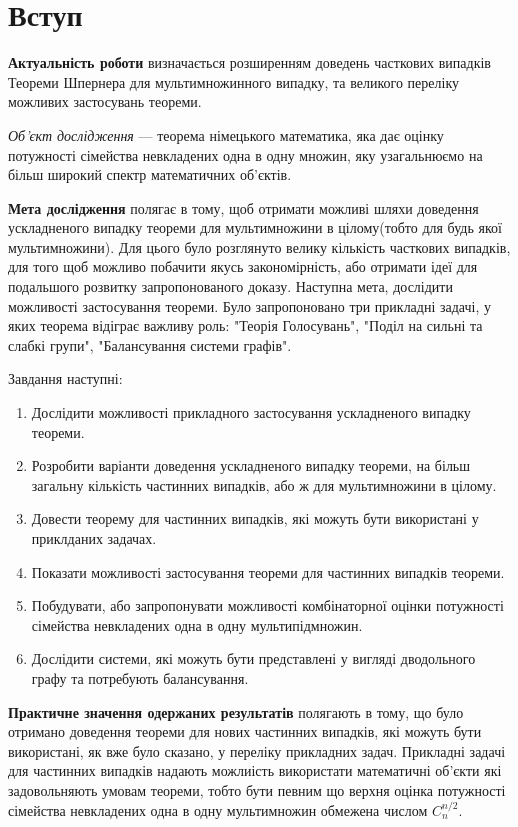 \chapter*{Вступ}

\textbf{Актуальність роботи} визначається розширенням доведень часткових випадків Теореми Шпернера для мультимножинного випадку, та великого переліку можливих застосувань теореми.

\textit{Об’єкт дослідження} --- теорема німецького математика, яка дає оцінку потужності сімейства невкладених одна в одну множин, яку узагальнюємо на більш широкий спектр математичних об'єктів.

\textbf{Мета дослідження} полягає в тому, щоб отримати можливі шляхи доведення ускладненого випадку теореми для мультимножини в цілому(тобто для будь якої мультимножини). Для цього було розглянуто велику кількість часткових випадків, для того щоб можливо побачити якусь закономірність, або отримати ідеї для подальшого розвитку запропонованого доказу. Наступна мета, дослідити можливості застосування теореми. Було запропоновано три прикладні задачі, у яких теорема відіграє важливу роль: "Теорія Голосувань", "Поділ на сильні та слабкі групи", "Балансування системи графів".

Завдання наступні:
\begin{enumerate}
  \item
    Дослідити можливості прикладного застосування ускладненого випадку теореми.
  \item
    Розробити варіанти доведення ускладненого випадку теореми, на більш загальну кількість частинних випадків, або ж для мультимножини в цілому.
   \item
   	Довести теорему для частинних випадків, які можуть бути використані у приклданих задачах.
   \item
   	Показати можливості застосування теореми для частинних випадків теореми.
   \item
    Побудувати, або запропонувати можливості комбінаторної оцінки потужності сімейства невкладених одна в одну мультипідмножин.
    \item
     Дослідити системи, які можуть бути представлені у вигляді дводольного графу та потребують балансування.
\end{enumerate}

\textbf{Практичне значення одержаних результатів} полягають в тому, що було отримано доведення теореми для нових частинних випадків, які можуть бути використані, як вже було сказано, у переліку прикладних задач. Прикладні задачі для частинних випадків надають можлиість використати математичні об'єкти які задовольняють умовам теореми, тобто бути певним що верхня оцінка потужності сімейства невкладених одна в одну мультимножин обмежена числом $C_n^{n/2}$.